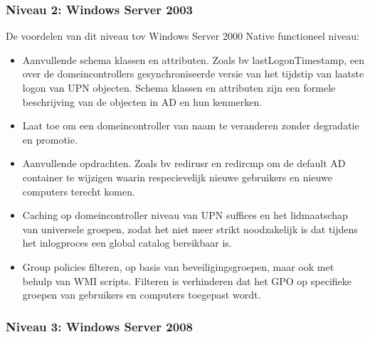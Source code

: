 \subsubsection{Niveau 2: Windows Server 2003}

De voordelen van dit niveau tov Windows Server 2000 Native functioneel niveau:
\begin{itemize}
	\item Aanvullende schema klassen en attributen. Zoals bv
		lastLogonTimestamp, een over de domeincontrollers
		gesynchroniseerde versie van het tijdstip van laatste logon van
		UPN objecten. Schema klassen en attributen zijn een formele
		beschrijving van de objecten in AD en hun kenmerken.
	\item Laat toe om een domeincontroller van naam te veranderen zonder
		degradatie en promotie.
	\item Aanvullende opdrachten. Zoals bv redirusr en redircmp om de
		default AD container te wijzigen waarin respecievelijk nieuwe
		gebruikers en nieuwe computers terecht komen.
	\item Caching op domeincontroller niveau van UPN suffices en het
		lidmaatschap van universele groepen, zodat het niet meer strikt
		noodzakelijk is dat tijdens het inlogproces een global catalog
		bereikbaar is.
	\item Group policies filteren, op basis van beveiligingsgroepen, maar
		ook met behulp van WMI scripts. Filteren is verhinderen dat het
		GPO op specifieke groepen van gebruikers en computers toegepast
		wordt.
\end{itemize}

\subsubsection{Niveau 3: Windows Server 2008}

